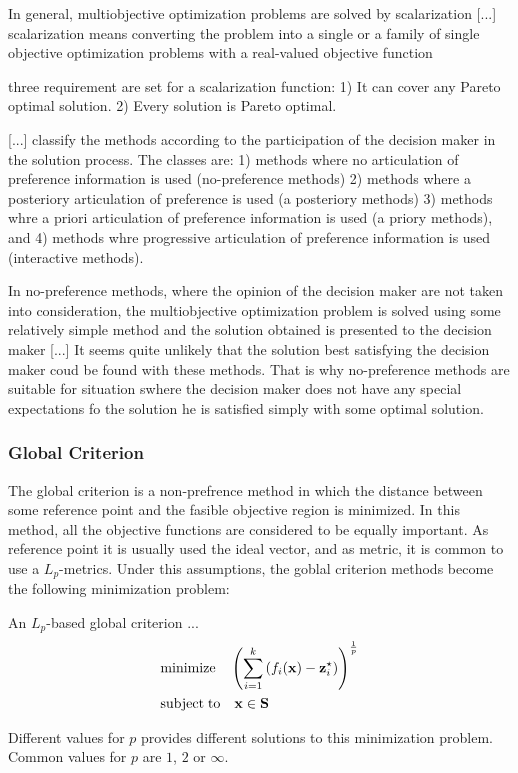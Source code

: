 {{\color{red} In general, multiobjective optimization problems are solved by scalarization [...] scalarization means converting the problem into a single or a family of single objective optimization problems with a real-valued objective function}

{\color{red} three requirement are set for a scalarization function: 1)  It can cover any Pareto optimal solution. 2) Every solution is Pareto optimal.}

{\color{red} [...] classify the methods according to the participation of the decision maker in the solution process. The classes are: 1) methods where no articulation of preference information is used (no-preference methods) 2) methods where a posteriory articulation of preference is used (a posteriory methods) 3) methods whre a priori articulation of preference information is used (a priory methods), and 4) methods whre progressive articulation of preference information is used (interactive methods).}

{\color{red} In no-preference methods, where the opinion of the decision maker are not taken into consideration, the multiobjective optimization problem is solved using some relatively simple method and the solution obtained is presented to the decision maker [...] It seems quite unlikely that the solution best satisfying the decision maker coud be found with these methods. That is why no-preference methods are suitable for situation swhere the decision maker does not have any special expectations fo the solution he is satisfied simply with some optimal solution.}

\subsubsection{Global Criterion}

The global criterion is a non-prefrence method in which the distance between some reference point and the fasible objective region is minimized. In this method, all the objective functions are considered to be equally important. As reference point it is usually used the ideal vector, and as metric, it is common to use a $L_p$-metrics. Under this assumptions, the goblal criterion methods become the following minimization problem:

\begin{definition}
An $L_p$-based global criterion ...
\begin{align*}
     & \text{minimize}    \quad \left( \sum_{i=1}^k \left( f_i(\mathbf{x}) - \mathbf{z}_i^\star \right) \right)^{\frac{1}{p}} \\
     & \text{subject\;to} \quad \mathbf{x} \in \mathbf{S}
\end{align*}
\end{definition}
Different values for $p$ provides different solutions to this minimization problem. Common values for $p$ are $1$, $2$ or $\infty$. 

}
